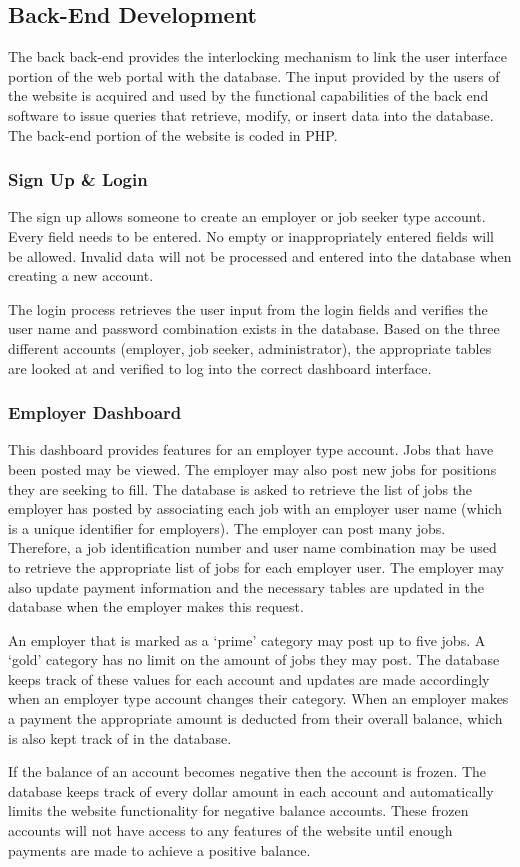 \documentclass[11pt]{article}
\begin{document}
\subsection{Back-End Development}

The back back-end provides the interlocking mechanism to link the user interface portion of the web portal with the database. The input provided by the users of the website is acquired and used by the functional capabilities of the back end software to issue queries that retrieve, modify, or insert data into the database. The back-end portion of the website is coded in PHP.

\subsubsection{Sign Up \& Login}

The sign up allows someone to create an employer or job seeker type account. Every field needs to be entered. No empty or inappropriately entered fields will be allowed. Invalid data will not be processed and entered into the database when creating a new account. \par
The login process retrieves the user input from the login fields and verifies the user name and password combination exists in the database. Based on the three different accounts (employer, job seeker, administrator), the appropriate tables are looked at and verified to log into the correct dashboard interface.

\subsubsection{Employer Dashboard}

This dashboard provides features for an employer type account. Jobs that have been posted may be viewed. The employer may also post new jobs for positions they are seeking to fill. The database is asked to retrieve the list of jobs the employer has posted by associating each job with an employer user name (which is a unique identifier for employers). The employer can post many jobs. Therefore, a job identification number and user name combination may be used to retrieve the appropriate list of jobs for each employer user. The employer may also update payment information and the necessary tables are updated in the database when the employer makes this request. \par 
	An employer that is marked as a `prime' category may post up to five jobs. A `gold' category has no limit on the amount of jobs they may post. The database keeps track of these values for each account and updates are made accordingly when an employer type account changes their category. When an employer makes a payment the appropriate amount is deducted from their overall balance, which is also kept track of in the database. \par
	If the balance of an account becomes negative then the account is frozen. The database keeps track of every dollar amount in each account and automatically limits the website functionality for negative balance accounts. These frozen accounts will not have access to any features of the website until enough payments are made to achieve a positive balance.	
	
\end{document}
